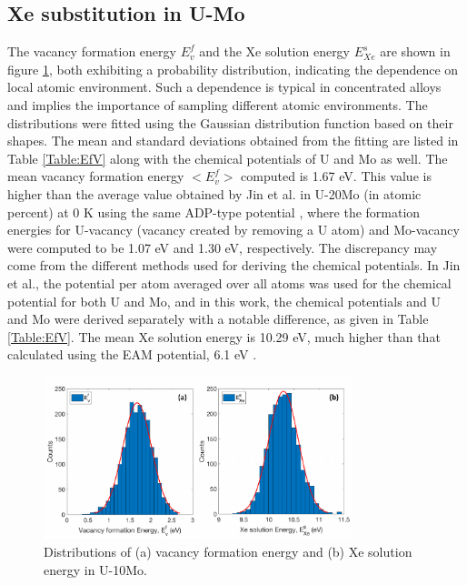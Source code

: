 \documentclass[review]{elsarticle}
\begin{document}
\subsection{Xe substitution in U-Mo}

The vacancy formation energy $E^f_v$ and the Xe solution energy $E^s_{Xe}$ are shown in figure \ref{fig:Evf}, both exhibiting a probability distribution, indicating the dependence on local atomic environment. Such a dependence is typical in concentrated alloys and implies the importance of sampling different atomic environments. The distributions were fitted using the Gaussian distribution function based on their shapes. The mean and standard deviations obtained from the fitting are listed in Table \ref{Table:EfV} along with the chemical potentials of U and Mo as well. The mean vacancy formation energy $<E^f_v>$ computed is 1.67 eV. This value is higher than the average value obtained by Jin et al. in U-20Mo (in atomic percent) at 0 K using the same ADP-type potential \cite{jin2021}, where the formation energies for U-vacancy (vacancy created by removing a U atom) and Mo-vacancy were computed to be 1.07 eV and 1.30 eV, respectively. The discrepancy may come from the different methods used for deriving the chemical potentials. In Jin et al., the potential per atom averaged over all atoms was used for the chemical potential for both U and Mo, and in this work, the chemical potentials and U and Mo were derived separately with a notable difference, as given in Table \ref{Table:EfV}. The mean Xe solution energy is 10.29 eV, much higher than that calculated using the EAM potential, 6.1 eV \cite{Beeler2020}. 

\begin{figure}[h!]
 \centering
 \includegraphics[width=0.8\textwidth]{EvF.pdf} 
 \caption{Distributions of (a) vacancy formation energy and (b) Xe solution energy in U-10Mo. }
 \label{fig:Evf}
\end{figure}
\end{document}
